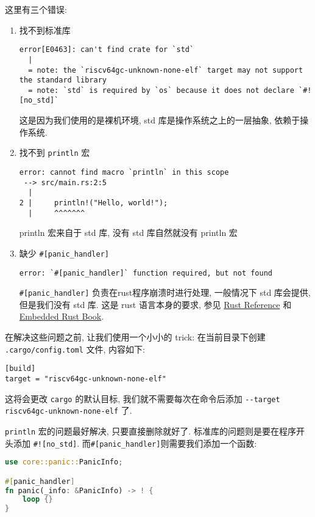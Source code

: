 \documentclass[a4paper]{ctexart}
\begin{document}
这里有三个错误:
\begin{enumerate}
    \item{找不到标准库}
        \begin{lstlisting}
error[E0463]: can't find crate for `std`
  |
  = note: the `riscv64gc-unknown-none-elf` target may not support the standard library
  = note: `std` is required by `os` because it does not declare `#![no_std]`
        \end{lstlisting}
        这是因为我们使用的是裸机环境,
        std 库是操作系统之上的一层抽象,
        依赖于操作系统.
    \item{找不到 \verb|println| 宏}
        \begin{lstlisting}
error: cannot find macro `println` in this scope
 --> src/main.rs:2:5
  |
2 |     println!("Hello, world!");
  |     ^^^^^^^
        \end{lstlisting}
        println 宏来自于 std 库,
        没有 std 库自然就没有 println 宏
    \item 缺少 \verb|#[panic_handler]|
        \begin{lstlisting}
error: `#[panic_handler]` function required, but not found
        \end{lstlisting}
        \verb|#[panic_handler]| 负责在rust程序崩溃时进行处理,
        一般情况下 std 库会提供, 但是我们没有 std 库.
        这是 rust 语言本身的要求, 参见
        \href{https://doc.rust-lang.org/reference/panic.html\#the-panic\_handler-attribute}{Rust Reference}
        和
        \href{https://docs.rust-embedded.org/book/start/panicking.html}{Embedded Rust Book}.
\end{enumerate}

在解决这些问题之前, 让我们使用一个小小的 trick:
在当前目录下创建 \verb|.cargo/config.toml| 文件, 内容如下:
\begin{lstlisting}
[build]
target = "riscv64gc-unknown-none-elf"
\end{lstlisting}
这将会更改 \verb|cargo| 的默认目标,
我们就不需要每次在命令后添加
\texttt{-{}-target riscv64gc-unknown-none-elf} 了.

\verb|println| 宏的问题最好解决, 只要直接删除就好了.
标准库的问题则是要在程序开头添加 \verb|#![no_std]|.
而\verb|#[panic_handler]|则需要我们添加一个函数:
\begin{lstlisting}[language=Rust]
use core::panic::PanicInfo;

#[panic_handler]
fn panic(_info: &PanicInfo) -> ! {
    loop {}
}
\end{lstlisting}
\end{document}
